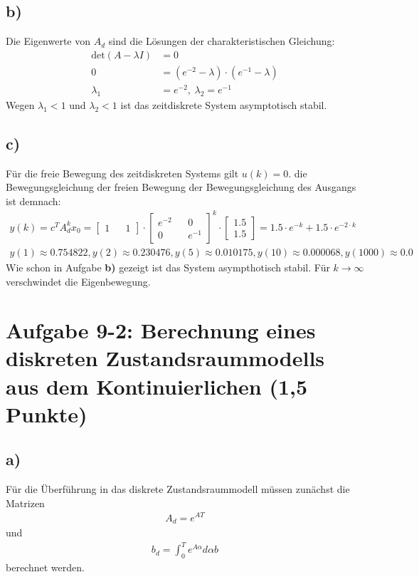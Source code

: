 \documentclass[11pt]{scrartcl} %
\begin{document}
\subsection*{b)}
Die Eigenwerte von $A_d$ sind die Lösungen der charakteristischen Gleichung:
\begin{align*}
	\text{det}(A-\lambda I)&=0\\
	0&=(e^{-2}-\lambda)\cdot(e^{-1}-\lambda)\\
	\lambda_1&=e^{-2},\hspace{3pt}\lambda_2=e^{-1}
\end{align*}
Wegen $\lambda_1<1$ und $\lambda_2<1$ ist das zeitdiskrete System asymptotisch stabil.
\subsection*{c)}
Für die freie Bewegung des zeitdiskreten Systems gilt $u(k)=0$. die Bewegungsgleichung der freien Bewegung der Bewegungsgleichung des Ausgangs ist demnach:
\begin{align*}
	y(k)=c^TA^k_dx_0=\begin{bmatrix}1&&1\end{bmatrix}\cdot\begin{bmatrix}e^{-2}&&0\\0&&e^{-1} \end{bmatrix}^k\cdot\begin{bmatrix}1.5\\1.5\end{bmatrix}=1.5\cdot e^{-k}+1.5\cdot e^{-2\cdot k}\\
	y(1)\approx0.754822,y(2)\approx0.230476,y(5)\approx0.010175,y(10)\approx0.000068,y(1000)\approx0.0
\end{align*}
Wie schon in Aufgabe \textbf{b)} gezeigt ist das System asympthotisch stabil. Für $k\rightarrow\infty$ verschwindet die Eigenbewegung.


\section*{Aufgabe 9-2: Berechnung eines diskreten Zustandsraummodells aus dem Kontinuierlichen (1,5 Punkte)}
\subsection*{a)}
Für die Überführung in das diskrete Zustandsraummodell müssen zunächst die Matrizen 
\begin{align*}
A_d = e^{AT}
\end{align*}
und 
\begin{align*}
b_d = \int^T_0 e^{A\alpha}d\alpha b
\end{align*} 
berechnet werden. \\
\end{document}
